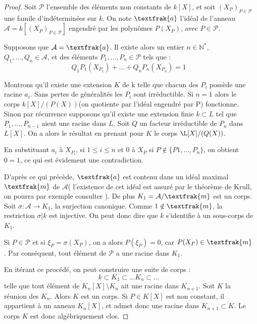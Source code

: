 \documentclass[12pt,a4paper]{report}
\begin{document}
\begin{proof}
Soit $\mathcal{P}$ l'ensemble des éléments non constants de $k[X]$, et soit $(X_P)_{P\in\mathcal{P}}$ une famile d'indéterminées sur $k$. On note $\textfrak{a}$ l'idéal de l'anneau $\mathcal{A}=k[(X_P)_{P\in\mathcal{P}}]$ engendré par les polynômes $P(X_P)$, avec $P\in \mathcal{P}$.

Supposons que $\mathcal{A}=\textfrak{a}$. Il existe alors un entier $n\in \mathbb{N}^{*}$, $Q_1,...,Q_n \in \mathcal{A}$, et des éléments $P_1,...,P_n \in \mathcal{P}$ tels que : 
$$Q_1P_1(X_{P_1})+...+Q_nP_n(X_{P_n})=1$$

Montrons qu'il existe une extension $K$ de k telle que chacun des $P_i$ possède une racine $a_i$. Sans pertes de généralités les $P_i$ sont irréductible. Si $n=1$ alors le corps $k[X]/(P(X))$(on quotiente par l'idéal engendré par P) fonctionne. Sinon par récurrence supposons qu'il existe une extension finie $k\subset L$ tel que $P_1,...,P_{n-1}$ aient une racine dans $L$. Soit $Q$ un facteur irréductible de $P_n$ dans $L[X]$. On a alors le résultat en prenant pour $K$ le corps $\L[X]/ (Q(X))$. 

En substituant $a_i$ à $X_{P_i}$, si $1\leq i\leq n$ et 0 à $X_P$ si $P\notin \{P1,...,P_n\}$, on obtient $0=1$, ce qui est évidement une contradiction. 

D'après ce qui précède, $\textfrak{a}$ est contenu dans un idéal maximal $\textfrak{m}$ de $\mathcal{A}$( l'existence de cet idéal est assuré par le théorème de Krull, on pourra par exemple consulter \cite{théorème_Krull}). De plus $K_1=\mathcal{A}/ \textfrak{m}$ est un corps. Soit $\sigma : \mathcal{A} \rightarrow K_1$, la surjection canonique. Comme $1 \notin \textfrak{m}$, la restriction $\sigma|k$ est injective. On peut donc dire que $k$ s'identifie à un sous-corps de $K_1$. 

Si $P\in \mathcal{P}$ et si $\xi_P=\sigma(X_P)$, on a alors $P(\xi_P)=0$, car $P(X_P)\in \textfrak{m}$. Par conséquent, tout élément de $\mathcal{P}$ a une racine dans $K_1$. 

En itérant ce procédé, on peut construire une suite de corps : 
$$k\subset K_1 \subset ... K_n \subset ...$$
telle que tout élément de $K_n[X]\setminus K_n$ ait une racine dans $K_{n+1}$. Soit $K$ la réunion des $K_n$. Alors $K$ est un corps. Si $P \in K[X]$ est non constant, il appartient à un anneau $K_n[X]$, et admet donc une racine dans $K_{n+1}\subset K$. Le corps $K$ est donc algébriquement clos. 
\end{proof}
\end{document}
